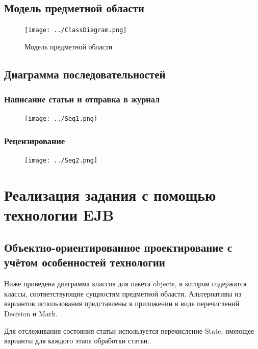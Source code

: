 \subsection{Модель предметной области}

\begin{figure}[H]
\centering
\texttt{[image: ../ClassDiagram.png]}
\caption{Модель предметной области}
\end{figure}

\subsection{Диаграмма последовательностей}

\subsubsection{Написание статьи и отправка в
журнал}

\begin{figure}[H]
\centering
\texttt{[image: ../Seq1.png]}
\caption{}
\end{figure}

\subsubsection{Рецензирование}

\begin{figure}[H]
\centering
\texttt{[image: ../Seq2.png]}
\caption{}
\end{figure}

\section{Реализация задания с помощью технологии EJB}

\subsection{Объектно-ориентированное проектирование с учётом особенностей технологии}

Ниже приведена диаграмма классов для пакета objects, в котором содержатся классы, соответствующие сущностям предметной области. Альтернативы из вариантов использования представлены в приложении в виде перечислений Decision и Mark.

Для отслеживания состояния статьи используется перечисление State, имеющее варианты для каждого этапа обработки статьи.

